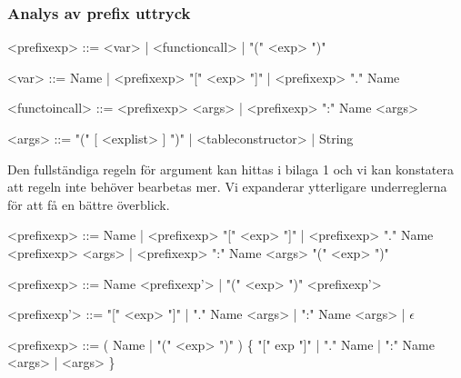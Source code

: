 \subsubsection{Analys av prefix uttryck}

\begin{description}
  \setlength{\grammarindent}{8em}
  \item[Ursprungsregel] \hfill
    \begin{grammar}
      \singlespace\small%
      \selectfont
      <prefixexp> ::= <var> | <functioncall> | "(" <exp> ")"

      <var> ::= Name | <prefixexp> "[" <exp> "]" | <prefixexp> "." Name

      <functoincall> ::= <prefixexp> <args> | <prefixexp> ":" Name <args>

      <args> ::= "(" [ <explist> ] ")" | <tableconstructor> | String
    \end{grammar}

    Den fullständiga regeln för argument kan hittas i bilaga 1 och vi kan
    konstatera att regeln inte behöver bearbetas mer. Vi expanderar
    ytterligare underreglerna för att få en bättre överblick.

    \begin{grammar}
      \singlespace\small%
      \selectfont
      <prefixexp> ::= Name | <prefixexp> "[" <exp> "]" | <prefixexp> "." Name
        \alt <prefixexp> <args> | <prefixexp> ":" Name <args>
        \alt "(" <exp> ")"
    \end{grammar}

  \item[Eliminering av vänster rekursion] \hfill
    \begin{grammar}
      \singlespace\small%
      \selectfont
      <prefixexp> ::= Name <prefixexp'> | "(" <exp> ")" <prefixexp'>

      <prefixexp'> ::= "[" <exp> "]" | "." Name <args> | ":" Name <args> |
      $\epsilon$
    \end{grammar}

  \item[Resultat] \hfill
    \begin{grammar}
      \singlespace\small%
      \selectfont
      <prefixexp> ::= ( Name | "(" <exp> ")" ) \{ "[" exp "]" | "." Name |
          ":" Name <args> | <args> \}
    \end{grammar}
\end{description}

